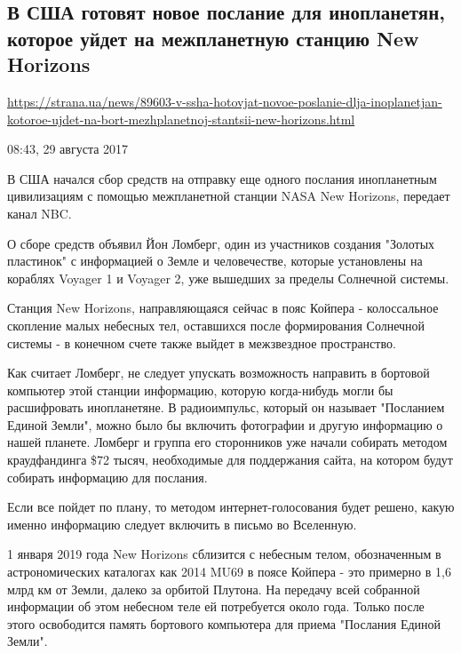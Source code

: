  
 

\subsection{В США готовят новое послание для инопланетян, которое уйдет на межпланетную станцию New Horizons}
\label{sec:29_08_2017.news.ua.strana.1_nasa_new_horizons}

\url{https://strana.ua/news/89603-v-ssha-hotovjat-novoe-poslanie-dlja-inoplanetjan-kotoroe-ujdet-na-bort-mezhplanetnoj-stantsii-new-horizons.html}

08:43, 29 августа 2017

В США начался сбор средств на отправку еще одного послания инопланетным
цивилизациям с помощью межпланетной станции NASA New Horizons, передает канал
NBC.

О сборе средств объявил Йон Ломберг, один из участников создания "Золотых
пластинок" с информацией о Земле и человечестве, которые установлены на
кораблях Voyager 1 и Voyager 2, уже вышедших за пределы Солнечной системы. 

Станция New Horizons, направляющаяся сейчас в пояс Койпера - колоссальное
скопление малых небесных тел, оставшихся после формирования Солнечной системы -
в конечном счете также выйдет в межзвездное пространство.

Как считает Ломберг, не следует упускать возможность направить в бортовой
компьютер этой станции информацию, которую когда-нибудь могли бы расшифровать
инопланетяне. В радиоимпульс, который он называет "Посланием Единой Земли",
можно было бы включить фотографии и другую информацию о нашей планете. Ломберг
и группа его сторонников уже начали собирать методом краудфандинга \$72 тысяч,
необходимые для поддержания сайта, на котором будут собирать информацию для
послания.

Если все пойдет по плану, то методом интернет-голосования будет решено, какую
именно информацию следует включить в письмо во Вселенную.

1 января 2019 года New Horizons сблизится с небесным телом, обозначенным в
астрономических каталогах как 2014 MU69 в поясе Койпера - это примерно в 1,6
млрд км от Земли, далеко за орбитой Плутона. На передачу всей собранной
информации об этом небесном теле ей потребуется около года. Только после этого
освободится память бортового компьютера для приема "Послания Единой Земли".

